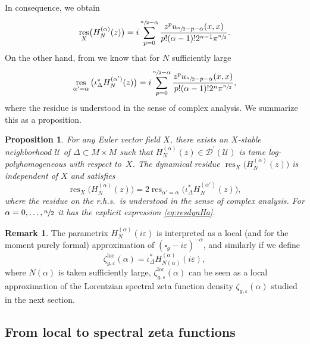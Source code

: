 \documentclass[10pt]{amsart}
\let\pazocal\mathscr
\newtheorem{proposition}[theorem]{Proposition}
\theoremstyle{definition}
\newtheorem{remark}[theorem]{Remark}
\newcommand\loc{\mathrm{loc}}
\let\cv\alpha
\let\euler X
\DeclareMathOperator{\resnorm}{res}
\DeclareMathOperator*{\res}{res}
\newcommand{\resdyn}{{\resnorm_\euler}}
\def\sn2{\sfrac{n}{2}}
\begin{document}
In consequence, we obtain
\begin{equation}\label{eq:resdynHa}
\resdyn\big(H_N^{(\cv)}(z)\big)=
i\sum_{p=0}^{\sfrac{n}{2}-\cv}
\frac{z^pu_{\sfrac{n}{2}-p-\cv}(x,x)}{p!(\cv-1)!2^{n-1}\pi^{\sfrac{n}{2}}}.
\end{equation}
On the other hand, from \cite[\S8.3.1]{Dang2020} we know that for $N$ sufficiently large
\begin{equation*}%
\res_{\alpha'=\alpha} \big(\iota^*_\Delta H_N^{(\alpha')}(z)\big)=
i\sum_{p=0}^{\sfrac{n}{2}-\cv}
\frac{z^p u_{\sfrac{n}{2}-p-\cv}(x,x)}{p!(\cv-1)!2^{n}\pi^{\sfrac{n}{2}}},
\end{equation*}
where the residue is understood in the sense of complex analysis.
We summarize this as a proposition.

\begin{proposition} For any Euler vector field $\euler$, there exists an $\euler$-stable neighborhood $\pazocal{U}$ of $\Delta\subset M\times M$ such that $H_N^{(\cv)}(z)\in \pazocal{D}^\prime(\pazocal{U})$
is tame log-polyhomogeneous with respect to~$\euler$. The dynamical residue $\resdyn\big(H_N^{(\cv)}(z)\big)$ is {independent of} $\euler$ and satisfies
\begin{equation*}%
\resdyn\big(H_N^{(\cv)}(z)\big)={2}\res_{\alpha'=\alpha} \big(\iota^*_\Delta H_N^{(\alpha')}(z)\big),
\end{equation*}
where the residue on the r.h.s.~is understood in the sense of complex analysis.
For $\alpha=0,\dots,\sn2$ it has the explicit expression \eqref{eq:resdynHa}.
\end{proposition}

\begin{remark} The parametrix $H_N^{(\cv)}(i\varepsilon)$ is interpreted as a local (and for the moment purely formal) approximation of $(\square_g-i \varepsilon)^{-\cv}$, and similarly if we define
\[
\zeta_{g,\varepsilon}^{\loc}(\cv)= \iota^*_\Delta H_{N(\alpha)}^{(\alpha)}(i \varepsilon),
\]
where $N(\alpha)$ is taken sufficiently large, $\zeta_{g,\varepsilon}^{\loc}(\cv)$ can be seen as a local approximation of the Lorentzian spectral zeta function density $\zeta_{g,\varepsilon}(\cv)$ studied in the next section.
\end{remark}

\subsection{From local to spectral zeta functions}\label{ss:lg}
\end{document}
